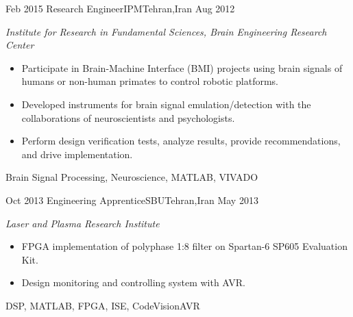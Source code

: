 \begin{experiences}
  \emptySeparator

  \experience
  {Feb 2015} {Research Engineer}{IPM}{Tehran,Iran}
  {Aug 2012} {
    \emph{Institute for Research in Fundamental Sciences, Brain Engineering Research Center}
    \begin{itemize}
      \item Participate in Brain-Machine Interface (BMI) projects using brain
            signals of humans or non-human primates to control robotic platforms.
      \item Developed instruments for brain signal emulation/detection
            with the collaborations of
            neuroscientists and psychologists.
      \item Perform design verification tests, analyze results, provide
            recommendations, and drive implementation.
    \end{itemize}
  }
  {Brain Signal Processing, Neuroscience, MATLAB, VIVADO}

  \emptySeparator

  \experience
  {Oct 2013} {Engineering Apprentice}{SBU}{Tehran,Iran}
  {May 2013} {
    \emph{Laser and Plasma Research Institute}
    \begin{itemize}
      \item FPGA implementation of polyphase 1:8 filter on Spartan-6 SP605 Evaluation Kit.
      \item Design monitoring and controlling system with AVR.
    \end{itemize}
  }
  {DSP, MATLAB, FPGA, ISE, CodeVisionAVR}
\end{experiences}
